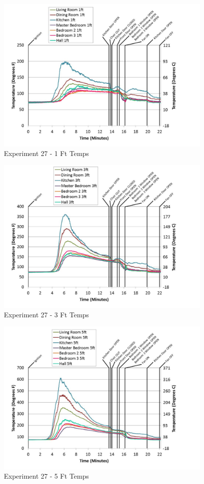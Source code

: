 \documentclass{article}
\begin{document}
\begin{appendices}
	\begin{figure}[h!]
		\centering
		\includegraphics[height=3.05in]{0_Images/Results_Charts/Exp_27_Charts/1FtTemps.pdf}
		\caption{Experiment 27 - 1 Ft Temps}
	\end{figure}
 

	\begin{figure}[h!]
		\centering
		\includegraphics[height=3.05in]{0_Images/Results_Charts/Exp_27_Charts/3FtTemps.pdf}
		\caption{Experiment 27 - 3 Ft Temps}
	\end{figure}
 
	\clearpage

	\begin{figure}[h!]
		\centering
		\includegraphics[height=3.05in]{0_Images/Results_Charts/Exp_27_Charts/5FtTemps.pdf}
		\caption{Experiment 27 - 5 Ft Temps}
	\end{figure}
 


\end{appendices}
\end{document}
